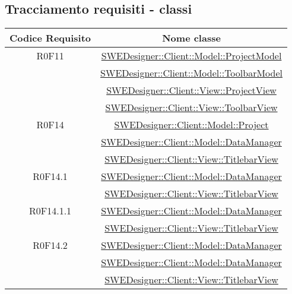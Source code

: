 \documentclass[../DefinizioneDiProdotto.tex]{subfiles}
\begin{document}
		\subsection{Tracciamento requisiti - classi}
			\normalsize
			\begin{longtable}{|c|c|}
				\hline
				\textbf{Codice Requisito} & \textbf{Nome classe} \\
				\hline
				\endhead
				
				R0F11
				& \hyperlink{SWEDesigner::Client::Model::ProjectModel}{SWEDesigner::Client::Model::ProjectModel}\\
				& \hyperlink{SWEDesigner::Client::Model::ToolbarModel}{SWEDesigner::Client::Model::ToolbarModel}\\
				& \hyperlink{SWEDesigner::Client::View::ProjectView}{SWEDesigner::Client::View::ProjectView}\\
				& \hyperlink{SWEDesigner::Client::View::ToolbarView}{SWEDesigner::Client::View::ToolbarView}\\
				\hline

				R0F14
				& \hyperlink{SWEDesigner::Client::Model::Project}{SWEDesigner::Client::Model::Project}\\
				& \hyperlink{SWEDesigner::Client::Model::DataManager}{SWEDesigner::Client::Model::DataManager}\\
				& \hyperlink{SWEDesigner::Client::View::TitlebarView}{SWEDesigner::Client::View::TitlebarView}\\
				\hline

				R0F14.1
				& \hyperlink{SWEDesigner::Client::Model::DataManager}{SWEDesigner::Client::Model::DataManager}\\
				& \hyperlink{SWEDesigner::Client::View::TitlebarView}{SWEDesigner::Client::View::TitlebarView}\\
				\hline

				R0F14.1.1
				& \hyperlink{SWEDesigner::Client::Model::DataManager}{SWEDesigner::Client::Model::DataManager}\\
				& \hyperlink{SWEDesigner::Client::View::TitlebarView}{SWEDesigner::Client::View::TitlebarView}\\
				\hline

				R0F14.2
				& \hyperlink{SWEDesigner::Client::Model::DataManager}{SWEDesigner::Client::Model::DataManager}\\
				& \hyperlink{SWEDesigner::Client::Model::DataManager}{SWEDesigner::Client::Model::DataManager}\\
				& \hyperlink{SWEDesigner::Client::View::TitlebarView}{SWEDesigner::Client::View::TitlebarView}\\
				\hline


\end{longtable}
\end{document}
